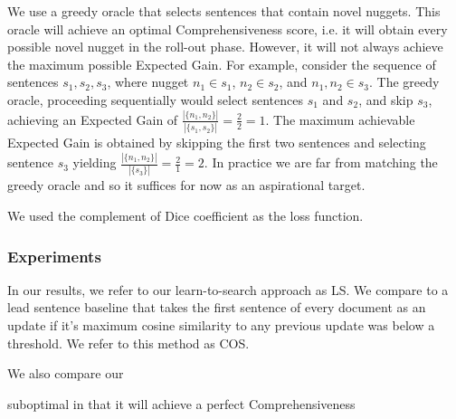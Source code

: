 We use a greedy oracle that selects sentences that contain novel
nuggets. This oracle will achieve an optimal Comprehensiveness score, i.e.
it will obtain every possible novel nugget in the roll-out phase.
However, it will not always achieve the maximum possible Expected Gain.
For example, consider the sequence of sentences $s_1, s_2, s_3$, where
nugget $n_1 \in s_1$, $n_2 \in s_2$, and $n_1,n_2 \in s_3$. The greedy oracle,
proceeding sequentially would select sentences $s_1$ and $s_2$, and skip
$s_3$, achieving an Expected Gain of $\frac{|\{n_1, n_2\}|}{|\{s_1, s_2 \}|} = \frac{2}{2} = 1$. The maximum achievable Expected Gain is obtained by skipping
the first two sentences and selecting sentence $s_3$ yielding $\frac{|\{n_1, n_2\}|}{|\{s_3 \}|} = \frac{2}{1} = 2$. In practice we are far from matching
the greedy oracle and so it suffices for now as an aspirational target.



We used the complement of Dice coefficient as the loss function.



\subsubsection{Experiments }

In our results, we refer to our learn-to-search approach as LS.
We compare to a lead sentence baseline that takes the first sentence
of every document as an update if it's maximum cosine similarity to any 
previous update was below a threshold. We refer to this method as COS.

We also compare our 








suboptimal in that it will achieve a perfect
Comprehensiveness 


